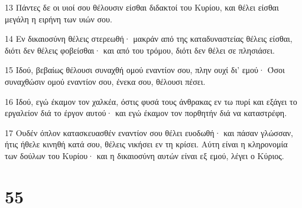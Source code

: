 \par 13 Πάντες δε οι υιοί σου θέλουσιν είσθαι διδακτοί του Κυρίου, και θέλει είσθαι μεγάλη η ειρήνη των υιών σου.
\par 14 Εν δικαιοσύνη θέλεις στερεωθή· μακράν από της καταδυναστείας θέλεις είσθαι, διότι δεν θέλεις φοβείσθαι· και από του τρόμου, διότι δεν θέλει σε πλησιάσει.
\par 15 Ιδού, βεβαίως θέλουσι συναχθή ομού εναντίον σου, πλην ουχί δι' εμού· Όσοι συναχθώσιν ομού εναντίον σου, ένεκα σου, θέλουσι πέσει.
\par 16 Ιδού, εγώ έκαμον τον χαλκέα, όστις φυσά τους άνθρακας εν τω πυρί και εξάγει το εργαλείον διά το έργον αυτού· και εγώ έκαμον τον πορθητήν διά να καταστρέφη.
\par 17 Ουδέν όπλον κατασκευασθέν εναντίον σου θέλει ευοδωθή· και πάσαν γλώσσαν, ήτις ήθελε κινηθή κατά σου, θέλεις νικήσει εν τη κρίσει. Αύτη είναι η κληρονομία των δούλων του Κυρίου· και η δικαιοσύνη αυτών είναι εξ εμού, λέγει ο Κύριος.

\chapter{55}

